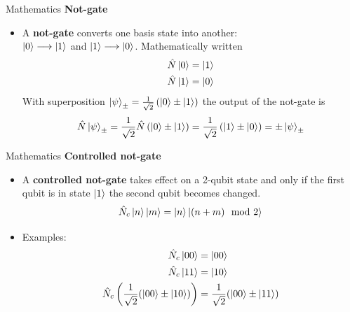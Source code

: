 \documentclass{beamer}
\begin{document}
\begin{frame}{Mathematics}
\textbf{Not-gate}
	\begin{itemize}
    	\item A \textbf{not-gate} converts one basis state into another:\\     $\ket{0}\longrightarrow\ket{1}$ and $\ket{1}\longrightarrow\ket{0}$. Mathematically  written
        \begin{equation}
        \begin{split}
        \hat{N}\ket{0}=\ket{1} \\ \hat{N}\ket{1}=\ket{0}
        \end{split}
        \end{equation}
        With superposition $\ket{\psi}_{\pm}= \frac{1}{\sqrt{2}}\left( \ket{0}\pm \ket{1}\right) $ the output of the not-gate is
        \begin{equation}
        \hat{N}\ket{\psi}_{\pm}=\frac{1}{\sqrt{2}}\hat{N}\left( \ket{0}\pm \ket{1}\right)=\frac{1}{\sqrt{2}}\left(\ket{1}\pm\ket{0}\right)=\pm\ket{\psi}_{\pm}
        \end{equation}
    \end{itemize}
\end{frame}

\begin{frame}{Mathematics}
\textbf{Controlled not-gate}
	\begin{itemize}
    	\item A \textbf{controlled not-gate} takes effect on a 2-qubit state and only if the first qubit is in state $\ket{1}$ the second qubit becomes changed.
        \begin{equation}
        \hat{N}_c\ket{n}\ket{m} = \ket{n}\ket{(n+m)\mod 2}
        \end{equation}
        \item Examples:
        \begin{equation}
        \begin{split}
        \hat{N}_c\ket{00} & =\ket{00} \\
        \hat{N}_c\ket{11} & =\ket{10} \\
        \hat{N}_c\left(\frac{1}{\sqrt{2}}(\ket{00}\pm\ket{10})\right) & = \frac{1}{\sqrt{2}}(\ket{00}\pm\ket{11})
        \end{split}
        \end{equation}
    \end{itemize}
\end{frame}
\end{document}
